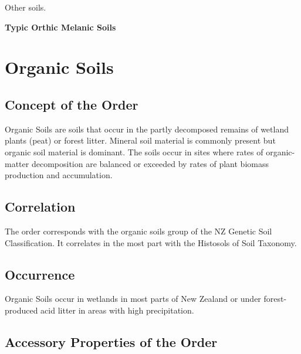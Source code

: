 \documentclass[
  letterpaper,
  DIV=11,
  numbers=noendperiod]{scrreprt}
\begin{document}
Other soils.

\textbf{Typic Orthic Melanic Soils}


\hypertarget{sec-ord-O}{%
\chapter{Organic Soils}\label{sec-ord-O}}

\hypertarget{sec-con-O}{%
\section{Concept of the Order}\label{sec-con-O}}

Organic Soils are soils that occur in the partly decomposed remains of
wetland plants (peat) or forest litter. Mineral soil material is
commonly present but organic soil material is dominant. The soils occur
in sites where rates of organic-matter decomposition are balanced or
exceeded by rates of plant biomass production and accumulation.

\hypertarget{sec-cor-O}{%
\section{Correlation}\label{sec-cor-O}}

The order corresponds with the organic soils group of the NZ Genetic
Soil Classification. It correlates in the most part with the Histosols
of Soil Taxonomy.

\hypertarget{sec-occ-O}{%
\section{Occurrence}\label{sec-occ-O}}

Organic Soils occur in wetlands in most parts of New Zealand or under
forest-produced acid litter in areas with high precipitation.

\hypertarget{sec-acc-O}{%
\section{Accessory Properties of the Order}\label{sec-acc-O}}
\end{document}
